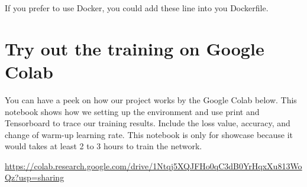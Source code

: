 \noindent If you prefer to use Docker, you could add these line into you Dockerfile.

\section{Try out the training on Google Colab}

You can have a peek on how our project works by the Google Colab below. This notebook shows how we setting up the environment and use print and Tensorboard to trace our training results. Include the loss value, accuracy, and change of warm-up learning rate. 
This notebook is only for showcase because it would takes at least 2 to 3 hours to train the network. 

\url{https://colab.research.google.com/drive/1Ntqj5XQJFHo0qC3dB0YrHqxXu813WoQz?usp=sharing}



